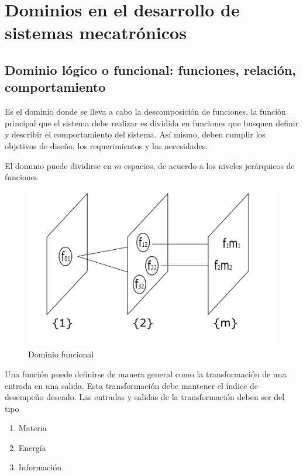 \section{Dominios en el desarrollo de sistemas mecatrónicos}

\subsection{Dominio lógico o funcional: funciones, relación, comportamiento}

Es el dominio donde se lleva a cabo la descomposición de funciones, la función principal que el sistema debe realizar es dividida en funciones que busquen definir y describir el comportamiento del sistema. Así mismo, deben cumplir los objetivos de diseño, los requerimientos y las necesidades. 

El dominio puede dividirse en \( m \) espacios, de acuerdo a los niveles jerárquicos de funciones

\begin{figure}[h!]
    \centering
        \includegraphics[scale=0.15]{Proyecto Integrador Figuras/11 dominio funcional.png}
        \caption{Dominio funcional}
\end{figure}

Una función puede definirse de manera general como la transformación de una entrada en una salida. Esta transformación debe mantener el índice de desempeño deseado. Las entradas y salidas de la transformación deben ser del tipo
\begin{enumerate}
    \item Materia
    \item Energía
    \item Información
\end{enumerate}

